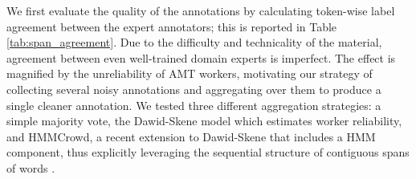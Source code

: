 \documentclass[11pt,a4paper]{article}
\begin{document}
We first evaluate the quality of the annotations by calculating token-wise label agreement between the expert annotators; this is reported in Table \ref{tab:span_agreement}.
Due to the difficulty and technicality of the material, agreement between even well-trained domain experts is imperfect.
The effect is magnified by the unreliability of AMT workers, motivating our strategy of collecting several noisy annotations and aggregating over them to produce a single cleaner annotation.
We tested three different aggregation strategies: a simple majority vote, the Dawid-Skene model \cite{dawid1979maximum} which estimates worker reliability, 
and HMMCrowd, a recent extension to Dawid-Skene that includes a HMM component, thus explicitly leveraging the sequential structure of contiguous spans of words \citep{nguyen2017aggregating}.%


\end{document}
